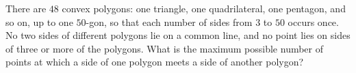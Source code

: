 There are $48$ convex polygons: one triangle, one quadrilateral, one pentagon, and so on, up to one $50$-gon, so that each number of sides from $3$ to $50$ occurs once. No two sides of different polygons lie on a common line, and no point lies on sides of three or more of the polygons. What is the maximum possible number of points at which a side of one polygon meets a side of another polygon?
